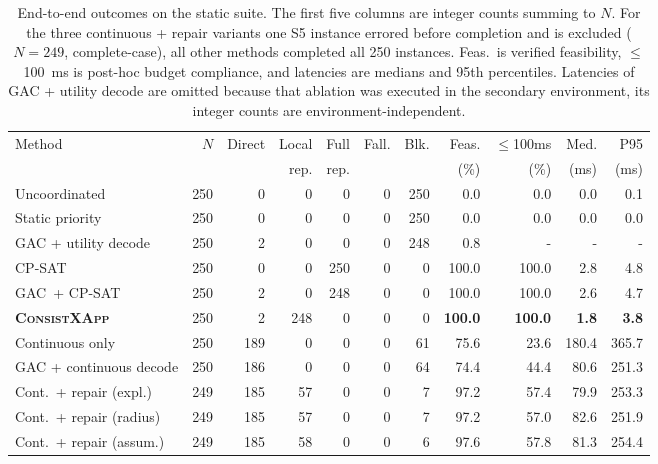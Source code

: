 \documentclass[pdflatex,sn-mathphys-num,iicol,oneside]{sn-jnl}
\newcommand{\method}{\textsc{ConsistXApp}}
\newcommand{\gac}{\textsc{GAC}}
\newcommand{\cpsat}{\textsc{CP-SAT}}
\begin{document}
\begin{table}[t]
\centering
\caption{End-to-end outcomes on the static suite. The first five
columns are integer counts summing to $N$. For the three continuous +
repair variants one S5 instance errored before completion and is
excluded ($N{=}249$, complete-case), all other methods completed all
250 instances. Feas.\ is verified feasibility, $\le$100~ms is post-hoc
budget compliance, and latencies are medians and 95th percentiles.
Latencies of GAC + utility decode are omitted because that ablation
was executed in the secondary environment, its integer counts are
environment-independent.}
\label{tab:main-results}
\setlength{\tabcolsep}{3pt}\footnotesize
\begin{tabular}{lrrrrrrrrrr}
\toprule
Method & $N$ & Direct & Local & Full & Fall. & Blk. & Feas. &
$\le$100ms & Med. & P95\\
& & & rep. & rep. & & & (\%) & (\%) & (ms) & (ms)\\
\midrule
Uncoordinated & 250 & 0 & 0 & 0 & 0 & 250 & 0.0 & 0.0 & 0.0 & 0.1\\
Static priority & 250 & 0 & 0 & 0 & 0 & 250 & 0.0 & 0.0 & 0.0 & 0.0\\
GAC + utility decode & 250 & 2 & 0 & 0 & 0 & 248 & 0.8 &  -  &  -  &  - \\
\cpsat & 250 & 0 & 0 & 250 & 0 & 0 & 100.0 & 100.0 & 2.8 & 4.8\\
\gac\ + \cpsat & 250 & 2 & 0 & 248 & 0 & 0 & 100.0 & 100.0 & 2.6 & 4.7\\
\textbf{\method} & 250 & 2 & 248 & 0 & 0 & 0 & \textbf{100.0} &
\textbf{100.0} & \textbf{1.8} & \textbf{3.8}\\
\midrule
Continuous only & 250 & 189 & 0 & 0 & 0 & 61 & 75.6 & 23.6 & 180.4 & 365.7\\
GAC + continuous decode & 250 & 186 & 0 & 0 & 0 & 64 & 74.4 & 44.4 & 80.6 & 251.3\\
Cont.\ + repair (expl.) & 249 & 185 & 57 & 0 & 0 & 7 & 97.2 & 57.4 & 79.9 & 253.3\\
Cont.\ + repair (radius) & 249 & 185 & 57 & 0 & 0 & 7 & 97.2 & 57.0 & 82.6 & 251.9\\
Cont.\ + repair (assum.) & 249 & 185 & 58 & 0 & 0 & 6 & 97.6 & 57.8 & 81.3 & 254.4\\
\bottomrule
\end{tabular}
\normalsize
\end{table}
\end{document}
